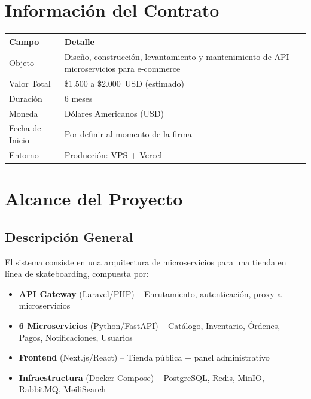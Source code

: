 \documentclass[11pt,a4paper]{article}
\newcommand{\contractvalue}{\$1.500 a \$2.000\ USD (estimado)}
\newcommand{\contractperiod}{6 meses}
\begin{document}
\section{Información del Contrato}

\begin{tabularx}{\textwidth}{lX}
\toprule
\textbf{Campo} & \textbf{Detalle} \\
\midrule
Objeto & Diseño, construcción, levantamiento y mantenimiento de API microservicios para e-commerce \\
Valor Total & \contractvalue \\
Duración & \contractperiod \\
Moneda & Dólares Americanos (USD) \\
Fecha de Inicio & Por definir al momento de la firma \\
Entorno & Producción: VPS + Vercel \\
\bottomrule
\end{tabularx}

\section{Alcance del Proyecto}

\subsection{Descripción General}

El sistema consiste en una arquitectura de microservicios para una tienda en línea de skateboarding, compuesta por:

\begin{itemize}[leftmargin=2cm]
    \item \textbf{API Gateway} (Laravel/PHP) -- Enrutamiento, autenticación, proxy a microservicios
    \item \textbf{6 Microservicios} (Python/FastAPI) -- Catálogo, Inventario, Órdenes, Pagos, Notificaciones, Usuarios
    \item \textbf{Frontend} (Next.js/React) -- Tienda pública + panel administrativo
    \item \textbf{Infraestructura} (Docker Compose) -- PostgreSQL, Redis, MinIO, RabbitMQ, MeiliSearch
\end{itemize}
\end{document}
